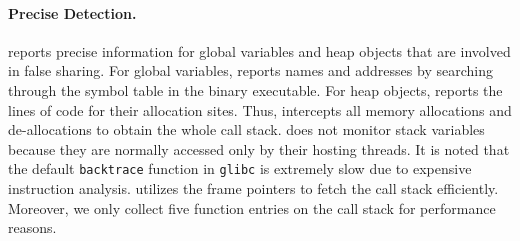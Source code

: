 \paragraph{Precise Detection.} \Cheetah{} reports precise information for global variables and heap objects that are involved in false sharing. For global variables, \Cheetah{} reports names and addresses by searching through the symbol table in the binary executable. For heap objects, \Cheetah{} reports the lines of code for their allocation sites. Thus, \Cheetah{} intercepts all memory allocations and de-allocations to obtain the whole call stack. 
\cheetah{} does not monitor stack variables because they are normally accessed only by their hosting threads. It is noted that the default \texttt{backtrace} function in \texttt{glibc} is extremely slow due to expensive instruction analysis. \cheetah{} utilizes the frame pointers to fetch the call stack efficiently. Moreover, we only collect five function entries on the call stack for performance reasons.

 
